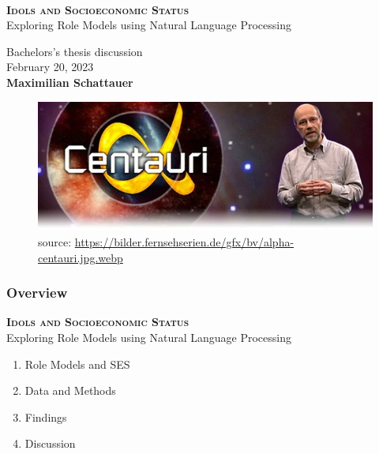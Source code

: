 



\begin{frame}
	\begin{center}
		\begin{block}
			{\centering\\
				\medskip
				\textbf{\textsc{Idols and Socioeconomic Status}}\\
                Exploring Role Models using Natural Language Processing\\
				\medskip}
		\end{block}

		\bigskip

		Bachelors's thesis discussion\\
		\medskip
		February 20, 2023\\

		\vspace{1cm}
		\textbf{Maximilian Schattauer}
	\end{center}
\end{frame}


\begin{frame}
	\begin{figure}
		\centering
		\includegraphics[scale=0.6]{img/lesch.png}
		\caption*{\tiny source: \href{https://bilder.fernsehserien.de/gfx/bv/alpha-centauri.jpg.webp}{https://bilder.fernsehserien.de/gfx/bv/alpha-centauri.jpg.webp}}
	\end{figure}
    
\end{frame}


\begin{frame}
	\frametitle{Overview}
	\begin{center}
		\textbf{\textsc{Idols and Socioeconomic Status}}\\
		Exploring Role Models using Natural Language Processing\\
	\end{center}
	\vspace{0.5cm}
    \begin{enumerate}
        \item Role Models and SES
        \item Data and Methods
        \item Findings
        \item Discussion
    \end{enumerate}
\end{frame}


